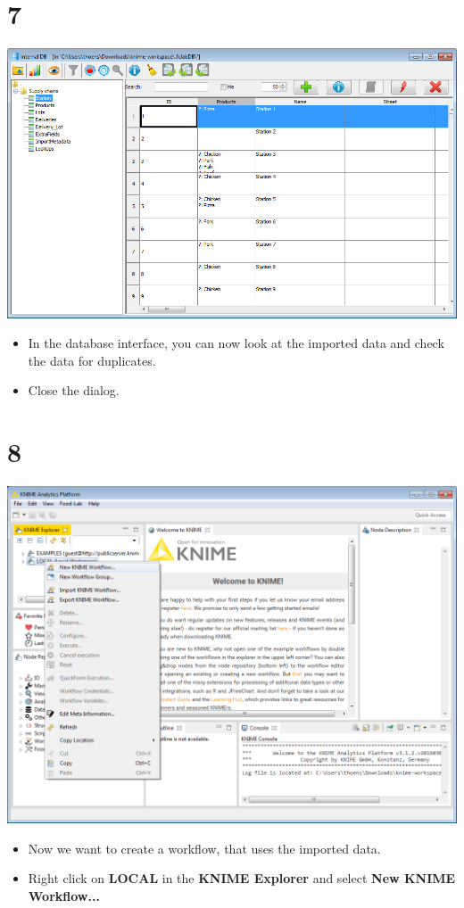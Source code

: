 \documentclass[10pt]{beamer}
\begin{document}
\section{7}
\begin{frame}
	\begin{center}
  		\includegraphics[height=0.6\textheight]{7.png}
	\end{center}
	\begin{itemize}
		\item In the database interface, you can now look at the imported data and check the data for duplicates.
		\item Close the dialog.
	\end{itemize}
\end{frame}

\section{8}
\begin{frame}
	\begin{center}
  		\includegraphics[height=0.6\textheight]{8.png}
	\end{center}
	\begin{itemize}
		\item Now we want to create a workflow, that uses the imported data.
		\item Right click on \textbf{LOCAL} in the \textbf{KNIME Explorer} and select \textbf{New KNIME Workflow...}
	\end{itemize}
\end{frame}
\end{document}
